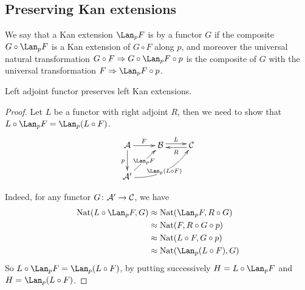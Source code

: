 \subsection{Preserving Kan extensions}
  \begin{defn}
    We say that a Kan extension $\Lan_pF$ is  by a functor $G$ if the composite $G\circ\Lan_pF$ is a Kan extension of $G\circ F$ along $p$, and moreover the universal natural transformation $G\circ F\then G\circ \Lan_pF\circ p$ is the composite of $G$ with the universal transformation $F\then \Lan_pF\circ p$.
  \end{defn}
  \begin{prop}
    Left adjoint functor preserves left Kan extensions.
  \end{prop}
  \begin{proof}
    Let $L$ be a functor with right adjoint $R$, then we need to show that $L\circ\Lan_pF=\Lan_p(L\circ F)$.
      \begin{displaymath}
        \xymatrix{
          \Aa\ar[d]_p\ar[r]^{F}&\Bb\ar@<0.5ex>[r]^{L}&\Cc\ar@<0.5ex>[l]^{R}\\
          \Aa'\ar[ur]|{\Lan_pF}\ar@/_1.1pc/[urr]|{\Lan_p(L\circ F)}
         }
      \end{displaymath}

      Indeed, for any functor $G\colon{\cal A}'\to{\cal C}$, we have
      \begin{align*}
        \Nat(L\circ\Lan_pF,G) &\approx\Nat(\Lan_pF,R\circ G)  \\
         &\approx\Nat(F,R\circ G\circ p) \\
         &\approx\Nat(L\circ F,G\circ p) \\
         &\approx\Nat(\Lan_p(L\circ F),G)
      \end{align*}
      So $L\circ\Lan_pF=\Lan_p(L\circ F)$, by putting successively $H=L\circ\Lan_pF$ and $H=\Lan_p(L\circ F)$.
  \end{proof}

